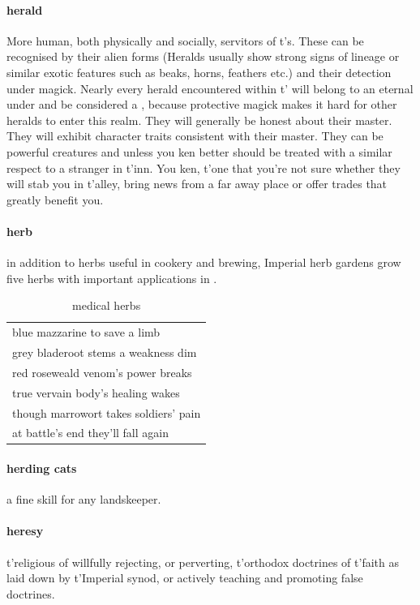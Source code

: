 \paragraph{herald} More human, both physically and socially, servitors of t'\allowbreak {}s. These can be recognised by their alien forms (Heralds usually show strong signs of lineage or similar exotic features such as beaks, horns, feathers etc.) and their detection under magick.  Nearly every herald encountered within t'\allowbreak {} will belong to an eternal under  and be considered a , because protective magick makes it hard for other heralds to enter this realm. They will generally be honest about their master. They will exhibit character traits consistent with their master. They can be powerful creatures and unless you ken better should be treated with a similar respect to a stranger in t'\allowbreak inn. You ken, t'\allowbreak one that you're not sure whether they will stab you in t'\allowbreak alley, bring news from a far away place or offer trades that greatly benefit you.
\paragraph{herb} in addition to herbs useful in cookery and brewing, Imperial herb gardens grow five herbs with important applications in . \begin{table} \begin{tabular}{p{}} blue mazzarine to save a limb\\ grey bladeroot stems a weakness dim\\ red roseweald venom’s power breaks\\ true vervain body's healing wakes\\ though marrowort takes soldiers' pain\\ at battle's end they'll fall again\\ \end{tabular}\caption{medical herbs}\end{table}
\paragraph{herding cats} a fine skill for any landskeeper.
\paragraph{heresy} t'\allowbreak religious  of willfully rejecting, or perverting, t'\allowbreak orthodox doctrines of t'\allowbreak faith as laid down by t'\allowbreak Imperial synod, or actively teaching and promoting false doctrines.
